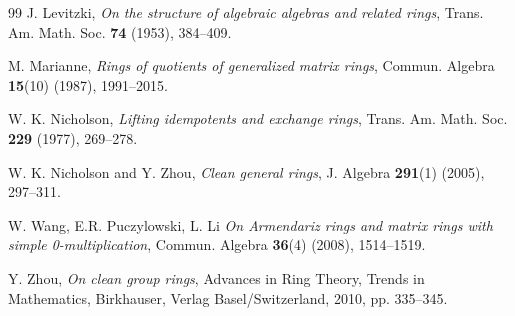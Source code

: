 \documentclass[12pt]{amsart}
\theoremstyle{definition}
\begin{document}
\begin{thebibliography}{99}
J. Levitzki, {\it On the structure of algebraic algebras and related rings}, Trans. Am. Math. Soc. {\bf 74} (1953), 384--409.

M. Marianne, {\it Rings of quotients of generalized matrix rings}, Commun. Algebra {\bf 15}(10) (1987), 1991--2015.

W. K. Nicholson, {\it Lifting idempotents and exchange rings}, Trans. Am. Math. Soc. {\bf 229} (1977), 269--278.

W. K. Nicholson and Y. Zhou, {\it Clean general rings}, J. Algebra {\bf 291}(1) (2005), 297--311.

W. Wang, E.R. Puczylowski, L. Li {\it On Armendariz rings and matrix rings with simple 0-multiplication}, Commun. Algebra {\bf 36}(4) (2008), 1514--1519.

Y. Zhou, {\it On clean group rings}, Advances in Ring Theory, Trends in Mathematics, Birkhauser, Verlag Basel/Switzerland, 2010, pp. 335--345.

\end{thebibliography}
\end{document}
